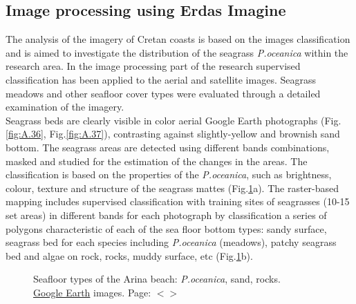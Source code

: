 \documentclass[11pt]{article}
\begin{document}
\subsection{Image processing using Erdas Imagine}\label{page-47}
The analysis of the imagery of Cretan coasts is based on the images classification and is aimed to
investigate the distribution of the seagrass \textit{P.oceanica} within the research area.
In the image processing part of the research supervised classification has been applied to the aerial
and satellite images. Seagrass meadows and other seafloor cover types were evaluated through a
detailed examination of the imagery. \\
Seagrass beds are clearly visible in color aerial Google Earth
photographs (Fig.\ref{fig:A.36}, Fig.\ref{fig:A.37}), contrasting against slightly-yellow and brownish sand bottom. The seagrass areas are
detected using different bands combinations, masked and studied for the estimation of the changes in
the areas. The classification is based on the properties of the \textit{P.oceanica}, such as brightness,
colour, texture and structure of the seagrass mattes (Fig.\ref{fig:38}a). The raster-based mapping\label{page-48}
includes supervised classification with training sites of seagrasses (10-15 set areas) in different bands
for each photograph by classification a series of polygons characteristic of each of the sea floor
bottom types: sandy surface, seagrass bed for each species including \textit{P.oceanica} (meadows), patchy
seagrass bed and algae on rock, rocks, muddy surface, etc (Fig.\ref{fig:38}b).

\begin{figure}[H]
	\centering
	\hspace{1ex}
	\caption{Seafloor types of the Arina beach: \textit{P.oceanica}, sand, rocks. \\ \href{http://www.google.com/earth/index.html}{Google Earth} images. Page: $<$\pageref{page-48}$>$}
	\label{fig:38}
\end{figure}
\end{document}
